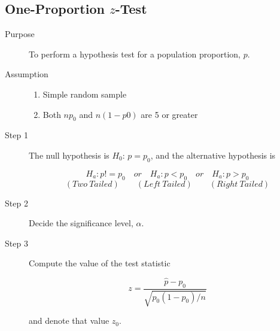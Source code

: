 \documentclass[12pt]{article}
\begin{document}
        \subsection*{One-Proportion $z$-Test}
            \begin{description}
                \item[Purpose] To perform a hypothesis test for a population proportion,
                $p$.
                \item[Assumption] 
                \begin{enumerate}
                    \item Simple random sample
                    \item Both $np_0$ and $n(1-p0)$ are 5 or greater
                \end{enumerate}
                \item[Step 1] The null hypothesis is $H_0$: $p = p_0$, and the alternative
                hypothesis is 
                \begin{center}
                    \[
                        H_a: p != p_0 \quad or \quad H_a: p < p_0 \quad or \quad 
                        H_a: p > p_0    
                    \]
                    \[
                        (Two \ Tailed)\quad\quad(Left \ Tailed)\quad\quad
                        (Right \ Tailed)    
                    \]                    
                \end{center}
                \item[Step 2] Decide the significance level, $\alpha$.
                \item[Step 3] Compute the value of the test statistic
                \begin{center}
                    \[
                        z = \frac{\hat{p}-p_0}{\sqrt{p_0(1-p_0)/n}}    
                    \]
                \end{center}  
                and denote that value $z_0$.
            \end{description}
\end{document}
